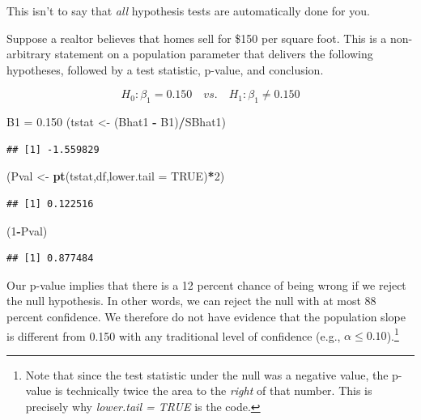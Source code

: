 \documentclass[
]{book}
\newenvironment{Shaded}{\begin{snugshade}}{\end{snugshade}}
\newcommand{\AttributeTok}[1]{\textcolor[rgb]{0.13,0.29,0.53}{#1}}
\newcommand{\ConstantTok}[1]{\textcolor[rgb]{0.56,0.35,0.01}{#1}}
\newcommand{\DecValTok}[1]{\textcolor[rgb]{0.00,0.00,0.81}{#1}}
\newcommand{\FloatTok}[1]{\textcolor[rgb]{0.00,0.00,0.81}{#1}}
\newcommand{\FunctionTok}[1]{\textcolor[rgb]{0.13,0.29,0.53}{\textbf{#1}}}
\newcommand{\NormalTok}[1]{#1}
\newcommand{\OtherTok}[1]{\textcolor[rgb]{0.56,0.35,0.01}{#1}}
\newcommand{\SpecialCharTok}[1]{\textcolor[rgb]{0.81,0.36,0.00}{\textbf{#1}}}
\begin{document}
This isn't to say that \emph{all} hypothesis tests are automatically done for you.

Suppose a realtor believes that homes sell for \$150 per square foot. This is a non-arbitrary statement on a population parameter that delivers the following hypotheses, followed by a test statistic, p-value, and conclusion.

\[H_0:\beta_1=0.150 \quad vs. \quad H_1:\beta_1\neq0.150\]

\begin{Shaded}
\begin{Highlighting}[]
\NormalTok{B1 }\OtherTok{=} \FloatTok{0.150}
\NormalTok{(tstat }\OtherTok{\textless{}{-}}\NormalTok{ (Bhat1 }\SpecialCharTok{{-}}\NormalTok{ B1)}\SpecialCharTok{/}\NormalTok{SBhat1)}
\end{Highlighting}
\end{Shaded}

\begin{verbatim}
## [1] -1.559829
\end{verbatim}

\begin{Shaded}
\begin{Highlighting}[]
\NormalTok{(Pval }\OtherTok{\textless{}{-}} \FunctionTok{pt}\NormalTok{(tstat,df,}\AttributeTok{lower.tail =} \ConstantTok{TRUE}\NormalTok{)}\SpecialCharTok{*}\DecValTok{2}\NormalTok{)}
\end{Highlighting}
\end{Shaded}

\begin{verbatim}
## [1] 0.122516
\end{verbatim}

\begin{Shaded}
\begin{Highlighting}[]
\NormalTok{(}\DecValTok{1}\SpecialCharTok{{-}}\NormalTok{Pval)}
\end{Highlighting}
\end{Shaded}

\begin{verbatim}
## [1] 0.877484
\end{verbatim}

Our p-value implies that there is a 12 percent chance of being wrong if we reject the null hypothesis. In other words, we can reject the null with at most 88 percent confidence. We therefore do not have evidence that the population slope is different from 0.150 with any traditional level of confidence (e.g., \(\alpha \leq 0.10\)).\footnote{Note that since the test statistic under the null was a negative value, the p-value is technically twice the area to the \emph{right} of that number. This is precisely why \emph{lower.tail = TRUE} is the code.}
\end{document}
